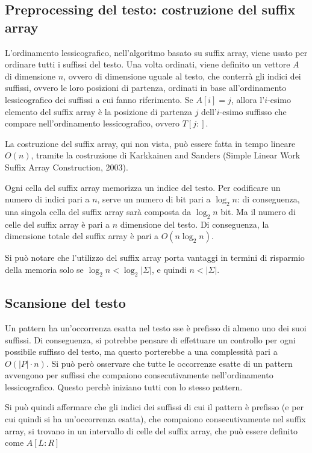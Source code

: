 \subsection*{Preprocessing del testo: costruzione del suffix array}
L'ordinamento lessicografico, nell'algoritmo basato su suffix array, viene usato
per ordinare tutti i suffissi del testo.
Una volta ordinati, viene definito un vettore $A$ di dimensione $n$, ovvero di
dimensione uguale al testo, che conterrà gli indici dei suffissi, ovvero le loro
posizioni di partenza, ordinati in base all'ordinamento lessicografico dei
suffissi a cui fanno riferimento.
Se $A[i] = j$, allora l'$i$-esimo elemento del suffix array è la posizione
di partenza $j$ dell'$i$-esimo suffisso che compare nell'ordinamento
lessicografico, ovvero $T[j:]$.

La costruzione del suffix array, qui non vista, può essere fatta in tempo
lineare $O(n)$, tramite la costruzione di Karkkainen and Sanders
(Simple Linear Work Suffix Array Construction, 2003).

\begin{rem}
    Ogni cella del suffix array memorizza un indice del testo. Per codificare un
    numero di indici pari a $n$, serve un numero di bit pari a $\log_2 n$: di
    conseguenza, una singola cella del suffix array sarà composta da $\log_2 n$ bit.
    Ma il numero di celle del suffix array è pari a $n$ dimensione del testo.
    Di conseguenza, la dimensione totale del suffix array è pari a $O(n \log_2 n)$.

    Si può notare che l'utilizzo del suffix array porta vantaggi in
    termini di risparmio della memoria solo se $\log_2 n < \log_2 |\Sigma|$, e
    quindi $n < |\Sigma|$.
\end{rem}

\subsection*{Scansione del testo}
Un pattern ha un'occorrenza esatta nel testo sse è prefisso di almeno uno dei
suoi suffissi.
Di conseguenza, si potrebbe pensare di effettuare un controllo per ogni
possibile suffisso del testo, ma questo porterebbe a una complessità pari a
$O(|P| \cdot n)$.
Si può però osservare che tutte le occorrenze esatte di un pattern avvengono
per suffissi che compaiono consecutivamente nell'ordinamento lessicografico.
Questo perchè iniziano tutti con lo stesso pattern.

Si può quindi affermare che gli indici dei suffissi di cui il pattern è
prefisso (e per cui quindi si ha un'occorrenza esatta), che compaiono
consecutivamente nel suffix array, si trovano in un intervallo di celle del
suffix array, che può essere definito come $A[L : R]$

